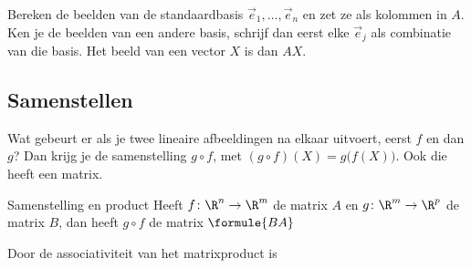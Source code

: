 
\begin{werkwijze}
Bereken de beelden van de standaardbasis $\vec e_1, \ldots, \vec e_n$ en zet ze als kolommen in $A$. Ken je de beelden van een andere basis, schrijf dan eerst elke $\vec e_j$ als combinatie van die basis. Het beeld van een vector $X$ is dan $AX$.
\end{werkwijze}

\begin{oefeningen}

\end{oefeningen}

\subsection{Samenstellen}

Wat gebeurt er als je twee lineaire afbeeldingen na elkaar uitvoert, eerst $f$ en dan $g$? Dan krijg je de samenstelling $g \circ f$, met $(g \circ f)(X) = g\bigl(f(X)\bigr)$. Ook die heeft een matrix.

\begin{theorie}
\begin{stelling}{Samenstelling en product}
Heeft $f \colon \R^n \to \R^m$ de matrix $A$ en $g \colon \R^m \to \R^p$ de matrix $B$, dan heeft $g \circ f$ de matrix \quad $\formule{BA}$
\end{stelling}

\begin{bewijs}
Door de associativiteit van het matrixproduct is
\end{bewijs}
\end{theorie}

